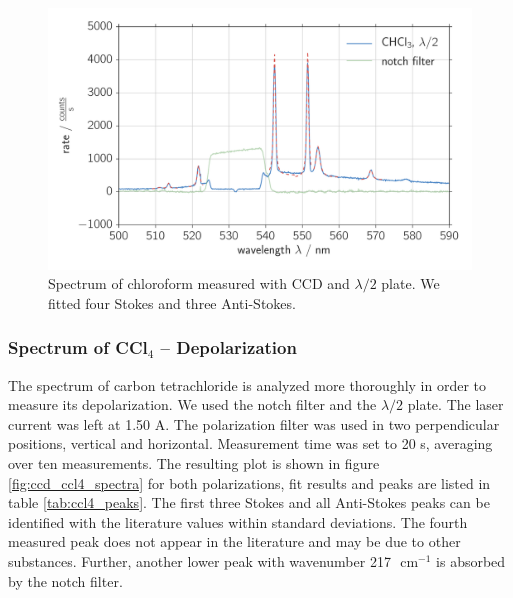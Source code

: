 \begin{figure}[htpb]
    \centering
    \includegraphics[width=0.8\linewidth]{analysis/figures/ccd_chcl3_spectra}
    \caption{
        Spectrum of chloroform measured with CCD and $\lambda / 2$ plate. We fitted four Stokes and 
        three Anti-Stokes. 
    }
    \label{fig:ccd_chcl3_spectra}
\end{figure}

\subsubsection{Spectrum of CCl$_4$ -- Depolarization}
The spectrum of carbon tetrachloride is analyzed more thoroughly in order to measure its depolarization. We used 
the notch filter and the $\lambda / 2$ plate. The laser current was left at 1.50 A. The polarization filter was 
used in two perpendicular positions, vertical and horizontal. Measurement time was set to 20 s, averaging over 
ten measurements. The resulting plot is shown in figure \ref{fig:ccd_ccl4_spectra} for both polarizations, fit results 
and peaks are listed in table \ref{tab:ccl4_peaks}. The first three Stokes and all Anti-Stokes peaks can be 
identified with the literature values within standard deviations. The fourth measured peak does not appear 
in the literature and may be due to other substances. Further, another lower peak with wavenumber 217
$\text{ cm}^{-1}$ is absorbed by the notch filter.

